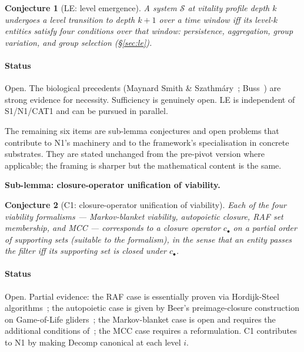 \documentclass[journal]{IEEEtran}
\theoremstyle{plain}
\theoremstyle{definition}
\theoremstyle{plain}
\newtheorem*{conjecturestar}{Conjecture}
\newenvironment{namedconjecture}[1]{%
  \begin{conjecturestar}[#1]%
}{\end{conjecturestar}}
\newcounter{topic}[subsection]
\newcommand{\topic}[1]{%
  \refstepcounter{topic}%
  \par\smallskip\noindent\textbf{#1.}\ }
\begin{document}
\begin{namedconjecture}{LE: level emergence}
A system $\mathcal{S}$ at vitality profile depth $k$ undergoes a level
transition to depth $k + 1$ over a time window iff its level-$k$
entities satisfy four conditions over that window: persistence,
aggregation, group variation, and group selection
(\S\ref{sec:le}).
\end{namedconjecture}

\paragraph{Status} Open. The biological precedents (Maynard Smith \&
Szathm\'ary~\cite{maynardsmith1995major}; Buss~\cite{buss1987evolution})
are strong evidence for necessity. Sufficiency is genuinely open. LE
is independent of S1/N1/CAT1 and can be pursued in parallel.

\medskip

\noindent The remaining six items are sub-lemma conjectures and open
problems that contribute to N1's machinery and to the framework's
specialisation in concrete substrates. They are stated unchanged from
the pre-pivot version where applicable; the framing is sharper but the
mathematical content is the same.

\topic{Sub-lemma: closure-operator unification of viability}\label{sec:c1}

\begin{namedconjecture}{C1: closure-operator unification of viability}
Each of the four viability formalisms --- Markov-blanket viability,
autopoietic closure, RAF set membership, and MCC --- corresponds to a
closure operator $c_\bullet$ on a partial order of supporting sets
(suitable to the formalism), in the sense that an entity passes the
filter iff its supporting set is closed under $c_\bullet$.
\end{namedconjecture}

\paragraph{Status} Open. Partial evidence: the RAF case is essentially
proven via Hordijk-Steel
algorithms~\cite{hordijk2004raf,hordijk2015algorithms}; the autopoietic
case is given by Beer's preimage-closure construction on Game-of-Life
gliders~\cite{beer2014glider,beer2015autopoiesis}; the Markov-blanket
case is open and requires the additional conditions
of~\cite{aguilera2022particular,heins2022sparse}; the MCC case requires
a reformulation. C1 contributes to N1 by making Decomp canonical at
each level $i$.
\end{document}
